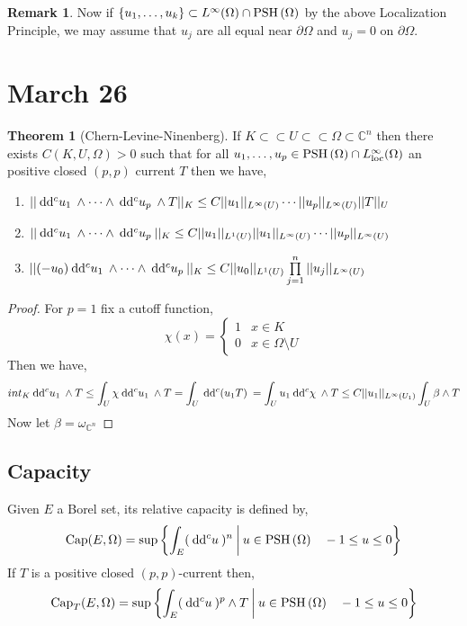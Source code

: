 \documentclass[12pt]{extarticle}
\newcommand{\C}{\mathbb{C}}
\renewcommand{\d}[1]{\: \mathrm{d}#1 \:}
\theoremstyle{definition}
\newtheorem{theorem}{Theorem}[section]
\newtheorem{remark}{Remark}
\newenvironment{definition}[1][Definition:]{\begin{trivlist}
\item[\hskip \labelsep {\bfseries #1}]}{\end{trivlist}}
\begin{document}
\begin{remark}
Now if $\{ u_1, \dots, u_k \} \subset L^\infty(\Omega) \cap \mathrm{PSH}\left( \Omega \right)$ by the above Localization Principle, we may assume that $u_j$ are all equal near $\partial \Omega$ and $u_j = 0$ on $\partial \Omega$. 
\end{remark}

\section{March 26}

\begin{theorem}[Chern-Levine-Ninenberg]
If $K \subset \subset U \subset \subset \Omega \subset \C^n$ then there exists $C(K, U, \Omega) > 0$ such that for all $u_1, \dots, u_p \in \mathrm{PSH}\left( \Omega \right) \cap L^\infty_{\text{loc}}(\Omega)$ an positive closed $(p,p)$ current $T$ then we have,
\begin{enumerate}
\item $ || \d{\dc{u_1}} \wedge \cdots \wedge \d{\dc{u_p}} \wedge T ||_K \le C || u_1 ||_{L^\infty(U)} \cdots || u_p ||_{L^\infty(U)} ||T||_U$ 
\item $ || \d{\dc{u_1}} \wedge \cdots \wedge \d{\dc{u_p}} ||_K \le C || u_1 ||_{L^1(U)} || u_1 ||_{L^\infty(U)} \cdots || u_p ||_{L^\infty(U)}$
\item $ || (-u_0) \d{\dc{u_1}} \wedge \cdots \wedge \d{\dc{u_p}} ||_K \le C || u_0 ||_{L^1(U)} \prod\limits_{j = 1}^n || u_j ||_{L^\infty(U)}$
\end{enumerate}
\end{theorem}

\begin{proof}
For $p = 1$ fix a cutoff function,
\[ \chi(x) = \begin{cases}
1 & x \in K 
\\
0 & x \in \Omega \setminus U 
\end{cases} \]
Then we have,
\[ int_K \d{\dc{u_1}} \wedge T \le \int_U \chi \d{\dc{u_1}} \wedge T = \int_U \d{\dc{(u_1 T)}} = \int_U u_1 \d{\dc{\chi}} \wedge T \le C || u_1 ||_{L^\infty(U_1)} \int_U \beta \wedge T \]
Now let $\beta = \omega_{\C^n}$ 
\end{proof}


\subsection{Capacity}

\renewcommand{\Cap}{\mathrm{Cap}}

\begin{definition}
Given $E$ a Borel set, its relative capacity is defined by,
\[ \Cap(E, \Omega) = \sup \left\{ \int_E (\d{\dc{u}})^n \: \middle| \: u \in \PSH{\Omega} \quad -1 \le u \le 0 \right\} \]
If $T$ is a positive closed $(p,p)$-current then,
\[ \Cap_T(E, \Omega) = \sup \left\{ \int_E (\d{\dc{u}})^p \wedge T \: \middle| \: u \in \PSH{\Omega} \quad -1 \le u \le 0 \right\} \]
\end{definition}
\end{document}
